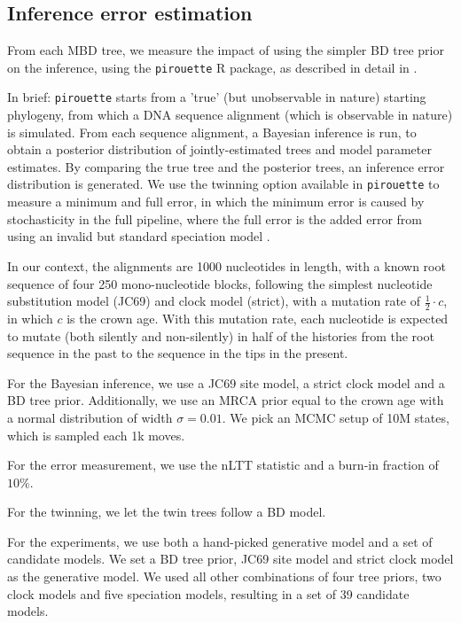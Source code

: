 \subsection{Inference error estimation}

From each MBD tree, we measure the impact of using the simpler BD tree prior on the inference, using the \verb;pirouette; R package, as described in detail in \citep{pirouette}.

In brief: \verb;pirouette; starts from a 'true' (but unobservable in nature) starting phylogeny, from which a DNA sequence alignment (which is observable in nature) is simulated. 
From each sequence alignment, a Bayesian inference is run, to obtain a posterior distribution of jointly-estimated trees and model parameter estimates.
By comparing the true tree and the posterior trees, an inference error distribution is generated. 
We use the twinning option available in \verb;pirouette; to measure a minimum and full error, in which the minimum error is caused by stochasticity in the full pipeline, where the full error is the added error from using an invalid but standard speciation model .

In our context, the alignments are 1000 nucleotides in length, with a known root sequence of four 250 mono-nucleotide blocks, following the simplest nucleotide substitution model (JC69) and clock model (strict), with a mutation rate of $\frac{1}{2}\cdot c$,  in which $c$ is the crown age. With this mutation rate, each nucleotide is expected to mutate (both silently and non-silently) 
in half of the histories from the root sequence in the past to the sequence in the tips in the present.

For the Bayesian inference, we use a JC69 site model, a strict
clock model and a BD tree prior. Additionally, we use 
an MRCA prior equal to the crown age with a normal distribution 
of width $\sigma = 0.01$. We pick an MCMC setup of 10M states,
which is sampled each 1k moves.

For the error measurement, we use the nLTT statistic \citet{janzen2015} and
a burn-in fraction of $10\%$.

For the twinning, we let the twin trees follow a BD model.

For the experiments, we use both a hand-picked generative model
and a set of candidate models. We set a BD tree prior, JC69 site
model and strict clock model as the generative model. We used
all other combinations of four tree priors, two clock models and
five speciation models, resulting in a set of 39 candidate models.

